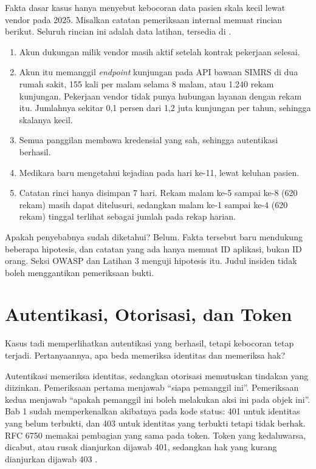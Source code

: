 \begin{kasus}[title={Kasus Medikara Health: Insiden Vendor 2025}]
Fakta dasar kasus hanya menyebut kebocoran data pasien skala kecil lewat vendor pada 2025. Misalkan catatan
pemeriksaan internal memuat rincian berikut. Seluruh rincian ini adalah data latihan, tersedia di
.
\begin{enumerate}
  \item Akun dukungan milik vendor masih aktif setelah kontrak pekerjaan selesai.
  \item Akun itu memanggil \textit{endpoint} kunjungan pada API bawaan SIMRS di dua rumah sakit, 155 kali per malam
        selama 8 malam, atau 1.240 rekam kunjungan. Pekerjaan vendor tidak punya hubungan layanan dengan rekam itu.
        Jumlahnya sekitar 0,1 persen dari 1,2 juta kunjungan per tahun, sehingga skalanya kecil.
  \item Semua panggilan membawa kredensial yang sah, sehingga autentikasi berhasil.
  \item Medikara baru mengetahui kejadian pada hari ke-11, lewat keluhan pasien.
  \item Catatan rinci hanya disimpan 7 hari. Rekam malam ke-5 sampai ke-8 (620 rekam) masih dapat ditelusuri, sedangkan
        malam ke-1 sampai ke-4 (620 rekam) tinggal terlihat sebagai jumlah pada rekap harian.
\end{enumerate}

Apakah penyebabnya sudah diketahui? Belum. Fakta tersebut baru mendukung beberapa hipotesis, dan catatan yang ada hanya
memuat ID aplikasi, bukan ID orang. Seksi OWASP dan Latihan 3 menguji hipotesis itu. Judul insiden tidak boleh
menggantikan pemeriksaan bukti.
\end{kasus}

\section{Autentikasi, Otorisasi, dan Token}

Kasus tadi memperlihatkan autentikasi yang berhasil, tetapi kebocoran tetap terjadi. Pertanyaannya, apa beda memeriksa
identitas dan memeriksa hak?

Autentikasi memeriksa identitas, sedangkan otorisasi memutuskan tindakan yang diizinkan. Pemeriksaan pertama menjawab
``siapa pemanggil ini''. Pemeriksaan kedua menjawab ``apakah pemanggil ini boleh melakukan aksi ini pada objek ini''.
Bab 1 sudah memperkenalkan akibatnya pada kode status: 401 untuk identitas yang belum terbukti, dan 403 untuk identitas
yang terbukti tetapi tidak berhak. RFC 6750 memakai pembagian yang sama pada token. Token yang kedaluwarsa, dicabut,
atau rusak dianjurkan dijawab 401, sedangkan hak yang kurang dianjurkan dijawab 403 \cite{c06-rfc6750}.

